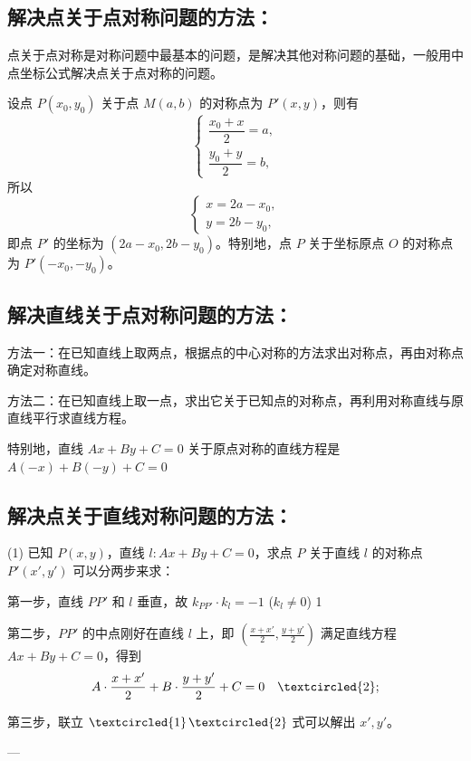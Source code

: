 \documentclass{article}
\begin{document}
\subsection*{解决点关于点对称问题的方法：}
点关于点对称是对称问题中最基本的问题，是解决其他对称问题的基础，一般用中点坐标公式解决点关于点对称的问题。

设点 \(P(x_0, y_0)\) 关于点 \(M(a, b)\) 的对称点为 \(P'(x, y)\)，则有
\[
\begin{cases}
\dfrac{x_0 + x}{2} = a, \\
\dfrac{y_0 + y}{2} = b,
\end{cases}
\]
所以
\[
\begin{cases}
x = 2a - x_0, \\
y = 2b - y_0,
\end{cases}
\]
即点 \(P'\) 的坐标为 \((2a - x_0, 2b - y_0)\)。特别地，点 \(P\) 关于坐标原点 \(O\) 的对称点为 \(P'(-x_0, -y_0)\)。

\subsection*{解决直线关于点对称问题的方法：}
方法一：在已知直线上取两点，根据点的中心对称的方法求出对称点，再由对称点确定对称直线。

方法二：在已知直线上取一点，求出它关于已知点的对称点，再利用对称直线与原直线平行求直线方程。

特别地，直线 \(Ax + By + C = 0\) 关于原点对称的直线方程是 \(A(-x) + B(-y) + C = 0\)

\subsection*{解决点关于直线对称问题的方法：}
(1) 已知 \(P(x, y)\)，直线 \(l: Ax + By + C = 0\)，求点 \(P\) 关于直线 \(l\) 的对称点 \(P'(x', y')\) 可以分两步来求：

第一步，直线 \(PP'\) 和 \(l\) 垂直，故 \(k_{PP'} \cdot k_l = -1\) (\(k_l \neq 0\)) \quad \textcircled{1}；

第二步，\(PP'\) 的中点刚好在直线 \(l\) 上，即 \(\left(\frac{x + x'}{2}, \frac{y + y'}{2}\right)\) 满足直线方程 \(Ax + By + C = 0\)，得到
\[
A \cdot \frac{x + x'}{2} + B \cdot \frac{y + y'}{2} + C = 0 \quad \textcircled{2};
\]

第三步，联立 \(\textcircled{1}\)\(\textcircled{2}\) 式可以解出 \(x', y'\)。

---
\end{document}
